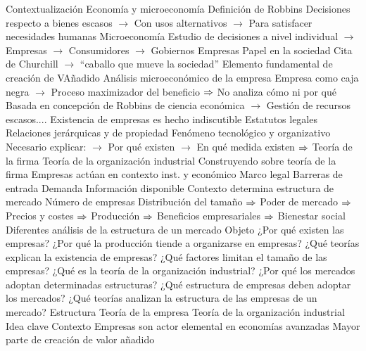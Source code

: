 \documentclass{nuevotema}
\begin{document}
\esquemalargo



\begin{esquemal}
	\1[] 
		\2 Contextualización
			\3 Economía y microeconomía
				\4 Definición de Robbins
				\4[] Decisiones respecto a bienes escasos
				\4[] $\to$ Con usos alternativos
				\4[] $\to$ Para satisfacer necesidades humanas
				\4 Microeconomía
				\4[] Estudio de decisiones a nivel individual
				\4[] $\to$ Empresas
				\4[] $\to$ Consumidores
				\4[] $\to$ Gobiernos
			\3 Empresas
				\4 Papel en la sociedad
				\4[] Cita de Churchill
				\4[] $\to$ ``caballo que mueve la sociedad''
				\4[] Elemento fundamental de creación de VAñadido
				\4 Análisis microeconómico de la empresa
				\4[] Empresa como caja negra
				\4[] $\to$ Proceso maximizador del beneficio
				\4[] $\Rightarrow$ No analiza cómo ni por qué
				\4[] Basada en concepción de Robbins de ciencia económica
				\4[] $\to$ Gestión de recursos escasos....
				\4 Existencia de empresas es hecho indiscutible
				\4[] Estatutos legales
				\4[] Relaciones jerárquicas y de propiedad
				\4[] Fenómeno tecnológico y organizativo
				\4[] Necesario explicar:
				\4[] $\to$ Por qué existen
				\4[] $\to$ En qué medida existen
				\4[] $\Rightarrow$ Teoría de la firma
			\3 Teoría de la organización industrial
				\4 Construyendo sobre teoría de la firma
				\4 Empresas actúan en contexto inst. y económico
				\4[] Marco legal
				\4[] Barreras de entrada
				\4[] Demanda
				\4[] Información disponible
				\4 Contexto determina estructura de mercado
				\4[] Número de empresas
				\4[] Distribución del tamaño
				\4[] $\Rightarrow$ Poder de mercado
				\4[] $\Rightarrow$ Precios y costes
				\4[] $\Rightarrow$ Producción
				\4[] $\Rightarrow$ Beneficios empresariales
				\4[] $\Rightarrow$ Bienestar social
				\4 Diferentes análisis de la estructura de un mercado
		\2 Objeto
			\3 ¿Por qué existen las empresas?
			\3 ¿Por qué la producción tiende a organizarse en empresas?
			\3 ¿Qué teorías explican la existencia de empresas?
			\3 ¿Qué factores limitan el tamaño de las empresas?
			\3 ¿Qué es la teoría de la organización industrial?
			\3 ¿Por qué los mercados adoptan determinadas estructuras?
			\3 ¿Qué estructura de empresas deben adoptar los mercados?
			\3 ¿Qué teorías analizan la estructura de las empresas de un mercado?
		\2 Estructura
			\3 Teoría de la empresa
			\3 Teoría de la organización industrial
	\1 
		\2 Idea clave
			\3 Contexto
				\4 Empresas son actor elemental en economías avanzadas
				\4[] Mayor parte de creación de valor añadido

\end{esquemal}
\end{document}
